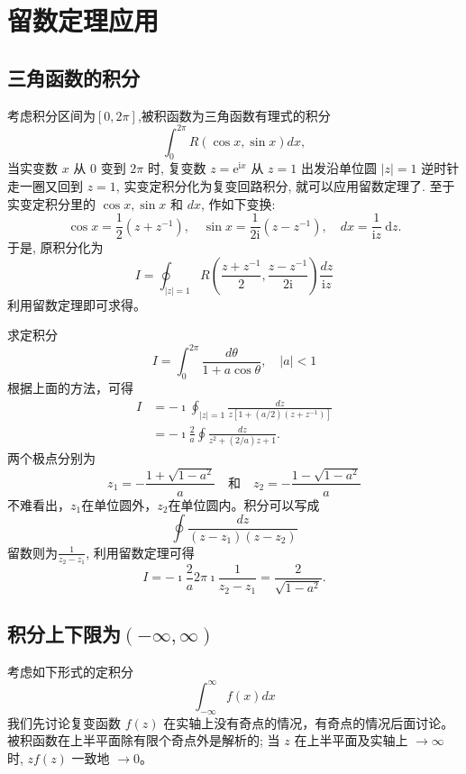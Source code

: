 \section{留数定理应用}
\subsection{三角函数的积分}
考虑积分区间为$\left[ 0, 2\pi \right]$,被积函数为三角函数有理式的积分
\begin{equation}
    \int_{0}^{2\pi} R(\cos{x}, \sin{x}) dx,
\end{equation}
当实变数 $x$ 从 0 变到 $2 \pi$ 时, 复变数 $z=\mathrm{e}^{\mathrm{i} x}$ 从 $z=1$ 出发沿单位圆 $|z|=1$ 逆时针 走一圈又回到 $z=1$,
实变定积分化为复变回路积分, 就可以应用留数定理了. 至于实变定积分里的 $\cos x, \sin x$ 和 $d x$, 作如下变换:
$$
\cos x=\frac{1}{2}\left(z+z^{-1}\right), \quad \sin x=\frac{1}{2 \mathrm{i}}\left(z-z^{-1}\right), \quad d x=\frac{1}{\mathrm{i} z} \mathrm{~d} z .
$$
于是, 原积分化为
$$
I=\oint_{|z|=1} R\left(\frac{z+z^{-1}}{2}, \frac{z-z^{-1}}{2 \mathrm{i}}\right) \frac{d z}{\mathrm{i} z}
$$
利用留数定理即可求得。

\begin{examplebox}{求定积分\[I=\int_0^{2 \pi} \frac{d \theta}{1+a \cos \theta}, \quad|a|<1 \]}
    根据上面的方法，可得
    \[
        \begin{aligned}
        I & =-\imath \oint_{|z|=1} \frac{d z}{z\left[1+(a / 2)\left(z+z^{-1}\right)\right]} \\
        & =-\imath \frac{2}{a} \oint \frac{d z}{z^2+(2 / a) z+1} .
        \end{aligned}
    \]
    两个极点分别为
    \[
        z_1=-\frac{1+\sqrt{1-a^2}}{a} \quad \text {和} \quad z_2=-\frac{1-\sqrt{1-a^2}}{a}
    \]
    不难看出，$z_1$在单位圆外，$z_2$在单位圆内。积分可以写成
    \[
      \oint \frac{dz}{(z-z_1)(z-z_2)}   
    \]
    留数则为$\frac{1}{z_2 - z_1}$, 利用留数定理可得 
    \[
      I=  -\imath \frac{2}{a} 2\pi\imath \frac{1}{z_2 - z_1} = \frac{2}{\sqrt{1 - a^2}} . 
    \]
\end{examplebox}



\subsection{积分上下限为$\left( -\infty, \infty \right)$}
 考虑如下形式的定积分
 \[
    \int_{-\infty}^{\infty} f(x) dx
 \]
 我们先讨论复变函数 $f(z)$ 在实轴上没有奇点的情况，有奇点的情况后面讨论。 
被积函数在上半平面除有限个奇点外是解析的; 当 $z$ 在上半平面及实轴上 $\to \infty$ 时, 
$z f(z)$ 一致地 $\to 0$。

